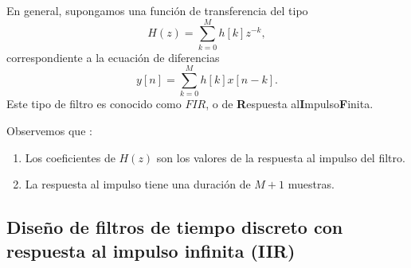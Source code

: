En general, supongamos una funci\'{o}n de transferencia del tipo
\begin{equation}
        H\left( z\right) =\sum_{k=0}^{M}h\left[ k\right] z^{-k},
\end{equation}
correspondiente a la ecuaci\'{o}n de diferencias 
\begin{equation}
        y\left[ n\right] =\sum_{k=0}^{M}h\left[ k\right] x\left[ n-k\right] .
\end{equation}
Este tipo de filtro es conocido como $FIR$, o de \textbf{R}espuesta al\textbf{I}mpulso\textbf{F}inita.

Observemos que :
\begin{enumerate}
      \item  Los coeficientes de $H\left( z\right) $ son los valores de la respuesta al impulso del filtro.
      \item  La respuesta al impulso tiene una duraci\'{o}n de $M+1$ muestras.
\end{enumerate}

\subsection{Dise\~{n}o de filtros de tiempo discreto con respuesta al impulso infinita (IIR) }


